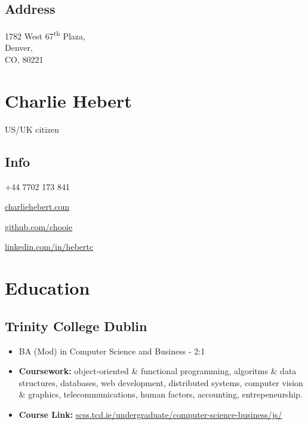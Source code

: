 \documentclass[a4paper]{article}
\begin{document}

\noindent\begin{minipage}[t]{0.333\textwidth}  
  \subsection*{Address}
  1782 West 67\textsuperscript{th} Plaza,\\
  Denver,\\
  CO, 80221\\
\end{minipage}
\noindent\begin{minipage}[t]{0.333\textwidth}
  \center
  \section*{Charlie Hebert}
  US/UK citizen
\end{minipage}
\noindent\begin{minipage}[t]{0.333\textwidth}
  \begin{flushright}
    \section*{Info}
  \end{flushright}

  \begin{description}
  \raggedleft
  \item[Mob] +44 7702 173 841
  \item[Web] \href{http://www.charliehebert.com}{charliehebert.com}
  \item[Github] \href{http://www.github.com/chooie}{github.com/chooie}
  \item[LinkedIn] \href{http://linkedin.com/in/hebertc}{linkedin.com/in/hebertc}
  \end{description}
\end{minipage}

\section*{Education}

\subsection*{Trinity College Dublin}
\begin{itemize}
\item BA (Mod) in Computer Science and Business - 2:1
\item{\textbf{Coursework:}} object-oriented \& functional programming, algoritms \& data structures, databases, web development, distributed systems, computer vision \& graphics, telecommunications, human factors, accounting, entrepeneurship.
\item{\textbf{Course Link:}} \href{https://www.scss.tcd.ie/undergraduate/computer-science-business/js/}{scss.tcd.ie/undergraduate/computer-science-business/js/}
\end{itemize}
\end{document}
